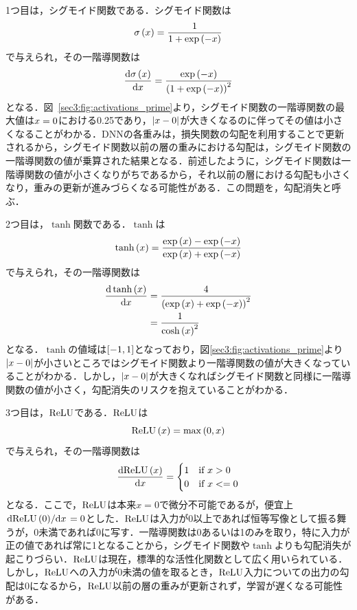1つ目は，シグモイド関数である．シグモイド関数は
\begin{equation}
    \sigma\left(x\right) = \frac{1}{1 + \exp\left(-x\right)}
\end{equation}
で与えられ，その一階導関数は
\begin{equation}
    \dv{\sigma\left(x\right)}{x} = \frac{\exp\left(-x\right)}{\left(1 + \exp\left(-x\right)\right)^{2}}
\end{equation}
となる．図~\ref{sec3:fig:activations_prime}より，シグモイド関数の一階導関数の最大値は$x=0$における0.25であり，$\left|x - 0\right|$が大きくなるのに伴ってその値は小さくなることがわかる．DNNの各重みは，損失関数の勾配を利用することで更新されるから，シグモイド関数以前の層の重みにおける勾配は，シグモイド関数の一階導関数の値が乗算された結果となる．前述したように，シグモイド関数は一階導関数の値が小さくなりがちであるから，それ以前の層における勾配も小さくなり，重みの更新が進みづらくなる可能性がある．この問題を，勾配消失と呼ぶ．

2つ目は，$\tanh$関数である．$\tanh$は
\begin{equation}
    \tanh\left(x\right) = \frac{\exp\left(x\right) - \exp\left(-x\right)}{\exp\left(x\right) + \exp\left(-x\right)}
\end{equation}
で与えられ，その一階導関数は
\begin{align}
    \dv{\tanh\left(x\right)}{x} & = \frac{4}{\left(\exp\left(x\right) + \exp\left(-x\right)\right)^{2}} \\
                                  & = \frac{1}{\cosh\left(x\right)^{2}}
\end{align}
となる．$\tanh$の値域は$\left[-1, 1\right]$となっており，図\ref{sec3:fig:activations_prime}より$\left|x - 0\right|$が小さいところではシグモイド関数より一階導関数の値が大きくなっていることがわかる．しかし，$\left|x - 0\right|$が大きくなればシグモイド関数と同様に一階導関数の値が小さく，勾配消失のリスクを抱えていることがわかる．

3つ目は，$\text{ReLU}$である．$\text{ReLU}$は
\begin{equation}
    \text{ReLU}\left(x\right) = \max \left(0, x\right)
\end{equation}
で与えられ，その一階導関数は
\begin{equation}
    \dv{\text{ReLU}\left(x\right)}{x} =
    \begin{cases}
        1 & \text{if $x > 0$}  \\
        0 & \text{if $x <= 0$}
    \end{cases}
\end{equation}
となる．ここで，$\text{ReLU}$は本来$x = 0$で微分不可能であるが，便宜上$\dv*{\text{ReLU}\left(0\right)}{x} = 0$とした．$\text{ReLU}$は入力が0以上であれば恒等写像として振る舞うが，0未満であれば0に写す．一階導関数は0あるいは1のみを取り，特に入力が正の値であれば常に1となることから，シグモイド関数や$\tanh$よりも勾配消失が起こりづらい．$\text{ReLU}$は現在，標準的な活性化関数として広く用いられている．しかし，$\text{ReLU}$への入力が0未満の値を取るとき，$\text{ReLU}$入力についての出力の勾配は0になるから，$\text{ReLU}$以前の層の重みが更新されず，学習が遅くなる可能性がある．

